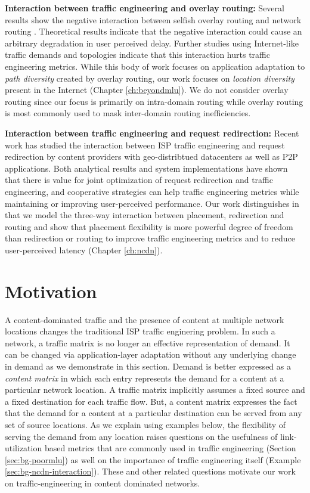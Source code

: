 \textbf{Interaction between traffic engineering and overlay routing:} Several results show the negative interaction between selfish overlay routing and network routing \cite{Roughgarden,selfishQiu}. Theoretical results indicate that the negative interaction could cause an arbitrary degradation in user perceived delay. Further studies using Internet-like traffic demands and topologies indicate that this interaction hurts traffic engineering metrics. While this body of work focuses on application adaptation to \emph{path diversity} created by overlay routing, our work focuses on \emph{location diversity} present in the Internet (Chapter \ref{ch:beyondmlu}). We do not consider overlay routing since our focus is primarily on intra-domain routing while overlay routing is most commonly used to mask inter-domain routing inefficiencies. 


\textbf{Interaction between traffic engineering and request redirection:} Recent work has studied the interaction between ISP traffic engineering and request redirection by content providers with geo-distribtued datacenters as well as P2P applications. Both analytical results \cite{Jiang2009,JohariGameTheory} and system implementations \cite{CATE,P4P} have shown that there is value for joint optimization of request redirection and traffic engineering, and cooperative strategies can help traffic engineering metrics while maintaining or improving user-perceived performance. Our work distinguishes in that  we model the three-way interaction between placement, redirection and routing and show that placement flexibility is more powerful degree of freedom than redirection or routing to improve traffic engineering metrics and to reduce user-perceived latency (Chapter \ref{ch:ncdn}).


\section{Motivation}
\label{sec:bg-motivation}

A content-dominated traffic and the presence of content at multiple network locations changes the traditional ISP traffic enginering problem. In such a network, a traffic matrix is no longer an effective representation of demand. It can be changed via application-layer adaptation without any underlying change in demand as we demonstrate in this section. Demand is better expressed as a \emph{content matrix} in which each entry represents the demand for a content at a particular network location. A traffic matrix implicitly assumes a fixed source and a fixed destination for each traffic flow. But, a content matrix expresses the fact that the demand for a content at a particular destination can be served from any set of source locations. As we explain using examples below, the flexibility of serving the demand from any location raises questions on the usefulness of link-utilization based metrics that are commonly used in traffic engineering (Section \ref{sec:bg-poormlu}) as well on the importance of traffic engineering itself (Example \ref{sec:bg-ncdn-interaction}). These and other related questions motivate our work on traffic-engineering in content dominated networks.

